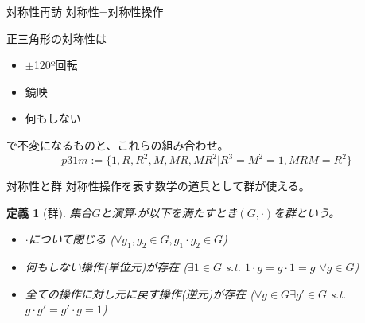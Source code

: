 \documentclass[dvipdfm]{beamer}
\newtheorem*{defn}{定義}
\begin{document}
\begin{frame}{対称性再訪}
    対称性=対称性操作
    \begin{figure}
        \centering
        \begin{minipage}{0.45\linewidth}
            \centering
        \end{minipage}
        \begin{minipage}{0.45\linewidth}
            \centering
        \end{minipage}
    \end{figure}
    正三角形の対称性は
    \begin{itemize}
        \item $\pm$120º回転
        \item 鏡映
        \item 何もしない
    \end{itemize}
    で不変になるものと、これらの組み合わせ。
    \begin{equation*}
        p31m:=\{1, R, R^2, M, MR, MR^2 | R^3=M^2=1, MRM=R^2\}
    \end{equation*}
\end{frame}

\begin{frame}{対称性と群}
    対称性操作を表す数学の道具として群が使える。
    \begin{defn}[群]
        集合$G$と演算$\cdot$が以下を満たすとき$(G,\cdot)$を群という。
        \begin{itemize}
            \item $\cdot$について閉じる ($\forall g_1,g_2\in G, g_1\cdot g_2\in G$)
            \item 何もしない操作(単位元)が存在 ($\exists 1\in G$ s.t. $1\cdot g=g\cdot1=g$ $\forall g\in G$)
            \item 全ての操作に対し元に戻す操作(逆元)が存在 ($\forall g\in G\exists g'\in G$ s.t. $g\cdot g'=g'\cdot g=1$)
        \end{itemize}
    \end{defn}
\end{frame}
\end{document}
